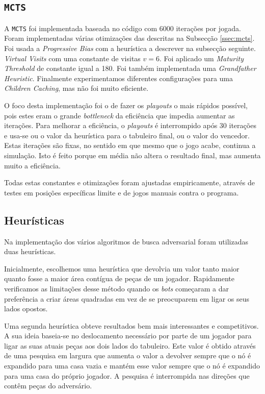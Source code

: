 \documentclass[12pt,a4paper,oneside]{article}
\begin{document}
\subsection{\texttt{MCTS}}

A \texttt{MCTS} foi implementada baseada no código \cite{MCTSHub} com
6000 iterações por jogada. Foram implementadas várias otimizações das
descritas na Subsecção \ref{ssec:mcts}. Foi usada a
\textit{Progressive Bias} com a heurística a descrever na subsecção
seguinte. \textit{Virtual Visits} com uma constante de visitas $v =
6$. Foi aplicado um \textit{Maturity Threshold} de constante igual a
180. Foi também implementada uma \textit{Grandfather
  Heuristic}. Finalmente experimentamos diferentes configurações para
uma \textit{Children Caching}, mas não foi muito eficiente.

O foco desta implementação foi o de fazer os \textit{playouts} o mais
rápidos possível, pois estes eram o grande \textit{bottleneck} da
eficiência que impedia aumentar as iterações. Para melhorar a
eficiência, o \textit{playouts} é interrompido após 30 iterações e
usa-se ou o valor da heurística para o tabuleiro final, ou o valor do
vencedor. Estas iterações são fixas, no sentido em que mesmo que o
jogo acabe, continua a simulação. Isto é feito porque em média não
altera o resultado final, mas aumenta muito a eficiência.

Todas estas constantes e otimizações foram ajustadas empiricamente,
através de testes em posições específicas limite e de jogos manuais
contra o programa.

\subsection{Heurísticas}

Na implementação dos vários algoritmos de busca adversarial foram
utilizadas duas heurísticas.

Inicialmente, escolhemos uma heurística que devolvia um valor tanto
maior quanto fosse a maior área contígua de peças de um
jogador. Rapidamente verificamos as limitações desse método quando os
\emph{bots} começaram a dar preferência a criar áreas quadradas em vez
de se preocuparem em ligar os seus lados opostos.

Uma segunda heurística obteve resultados bem mais interessantes e
competitivos. A sua ideia baseia-se no deslocamento necessário por
parte de um jogador para ligar as suas atuais peças aos dois lados do
tabuleiro. Este valor é obtido através de uma pesquisa em largura que
aumenta o valor a devolver sempre que o nó é expandido para uma casa
vazia e mantém esse valor sempre que o nó é expandido para uma casa do
próprio jogador. A pesquisa é interrompida nas direções que contêm
peças do adversário.
\end{document}
